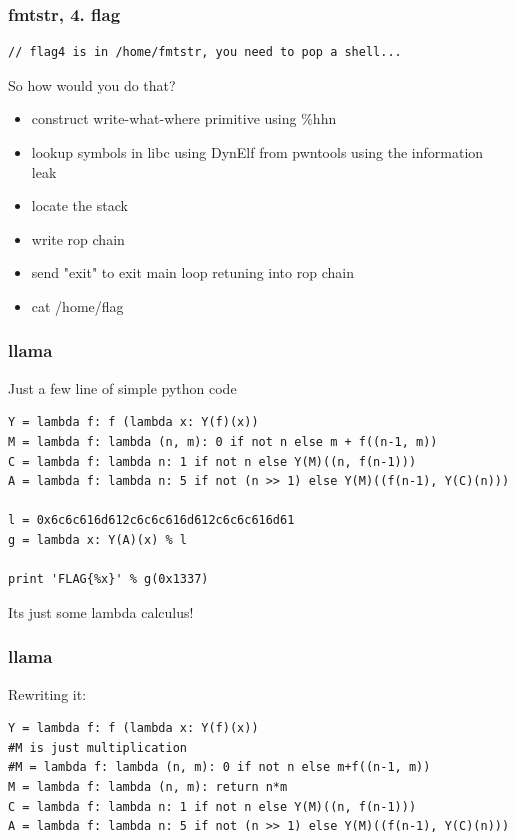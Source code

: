 \documentclass{beamer}
\begin{document}
\begin{frame}[fragile]
    \frametitle{fmtstr, 4. flag}
    \begin{lstlisting}[style=custompy]
// flag4 is in /home/fmtstr, you need to pop a shell...
    \end{lstlisting}

    \pause
    
    So how would you do that?

    \begin{itemize}
        \pause \item construct write-what-where primitive using \%hhn
        \pause \item lookup symbols in libc using DynElf from pwntools using the information leak
        \pause \item locate the stack
        \pause \item write rop chain
        \pause \item send "exit" to exit main loop retuning into rop chain
        \pause \item cat /home/flag
    \end{itemize}
\end{frame}

\begin{frame}[fragile]
    \frametitle{llama}
    
    Just a few line of simple python code

    \begin{lstlisting}[style=custompy]
Y = lambda f: f (lambda x: Y(f)(x))
M = lambda f: lambda (n, m): 0 if not n else m + f((n-1, m))
C = lambda f: lambda n: 1 if not n else Y(M)((n, f(n-1)))
A = lambda f: lambda n: 5 if not (n >> 1) else Y(M)((f(n-1), Y(C)(n)))

l = 0x6c6c616d612c6c6c616d612c6c6c616d61
g = lambda x: Y(A)(x) % l

print 'FLAG{%x}' % g(0x1337)
    \end{lstlisting}

    \pause
    
    Its just some lambda calculus!
\end{frame}

\begin{frame}[fragile]
    \frametitle{llama}

    Rewriting it:

    \begin{lstlisting}[style=custompy]
Y = lambda f: f (lambda x: Y(f)(x))
#M is just multiplication
#M = lambda f: lambda (n, m): 0 if not n else m+f((n-1, m))
M = lambda f: lambda (n, m): return n*m
C = lambda f: lambda n: 1 if not n else Y(M)((n, f(n-1)))
A = lambda f: lambda n: 5 if not (n >> 1) else Y(M)((f(n-1), Y(C)(n)))
    \end{lstlisting}
\end{frame}
\end{document}

